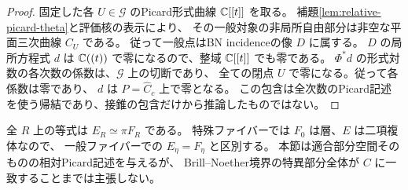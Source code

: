 \begin{proof}
固定した各 $U\in\mathcal G$ のPicard形式曲線 $\mathbb C[[t]]$ を取る。
補題\ref{lem:relative-picard-theta}と評価核の表示により、
その一般対象の非局所自由部分は非空な平面三次曲線 $C_U$ である。
従って一般点はBN incidenceの像 $D$ に属する。
$D$ の局所方程式 $d$ は $\mathbb C((t))$ で零になるので、整域 $\mathbb C[[t]]$ でも零である。
$\Phi^*d$ の形式対数の各次数の係数は、$\mathcal G$ 上の切断であり、
全ての閉点 $U$ で零になる。従って各係数は零であり、
$d$ は $P=\widehat C_c$ 上で零となる。
この包含は全次数のPicard記述を使う帰結であり、接錐の包含だけから推論したものではない。
\end{proof}

\begin{remark}
全 $R$ 上の等式は $E_R\simeq\pi F_R$ である。
特殊ファイバーでは $F_0$ は層、$E$ は二項複体なので、
一般ファイバーでの $E_\eta=F_\eta$ と区別する。
本節は適合部分空間そのものの相対Picard記述を与えるが、
Brill--Noether境界の特異部分全体が $C$ に一致することまでは主張しない。
\end{remark}

